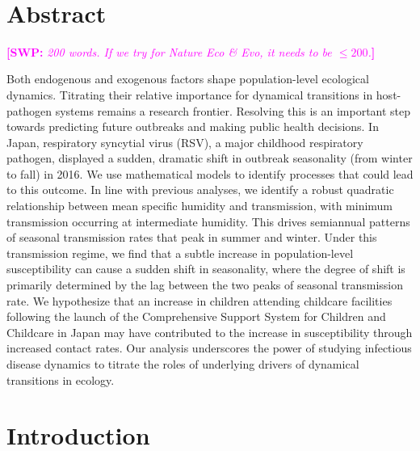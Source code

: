\documentclass[12pt]{article}
\date{\today}
\newcommand{\comment}{\showcomment}
\newcommand{\showcomment}[3]{\textcolor{#1}{\textbf{[#2: }\textsl{#3}\textbf{]}}}
\newcommand{\swp}[1]{\comment{magenta}{SWP}{#1}}
\begin{document}
\begin{flushleft}{
	\Large
	\textbf{}
}
\newline
\\
\bigskip
\end{flushleft}

\section*{Abstract} \swp{200 words. If we try for Nature Eco \& Evo, it needs to be $\leq 200$.}

Both endogenous and exogenous factors shape population-level ecological dynamics. Titrating their relative importance for dynamical transitions in host-pathogen systems remains a research frontier. Resolving this is an important step towards predicting future outbreaks and making public health decisions.
In Japan, respiratory syncytial virus (RSV), a major childhood respiratory pathogen, displayed a sudden, dramatic shift in outbreak seasonality (from winter to fall) in 2016. We use mathematical models to identify processes that could lead to this outcome.
In line with previous analyses, we identify a robust quadratic relationship between mean specific humidity and transmission, with minimum transmission occurring at intermediate humidity.
This drives semiannual patterns of seasonal transmission rates that peak in summer and winter.
Under this transmission regime, we find that a subtle increase in population-level susceptibility can cause a sudden shift in seasonality, where the degree of shift is primarily determined by the lag between the two peaks of seasonal transmission rate.
We hypothesize that an increase in children attending childcare facilities following the launch of the Comprehensive Support System for Children and Childcare in Japan may have contributed to the increase in susceptibility through increased contact rates.
Our analysis underscores the power of studying infectious disease dynamics to titrate the roles of underlying drivers of dynamical transitions in ecology.

\pagebreak

\section*{Introduction}
\end{document}
